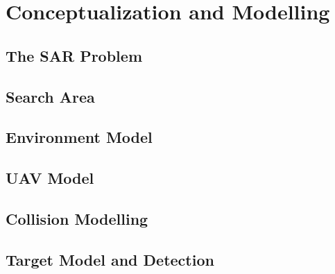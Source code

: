 \chapter{Conceptualization and Modelling}

\section{The SAR Problem}

\section{Search Area}

\section{Environment Model}

\section{UAV Model}

\section{Collision Modelling}

\section{Target Model and Detection}
